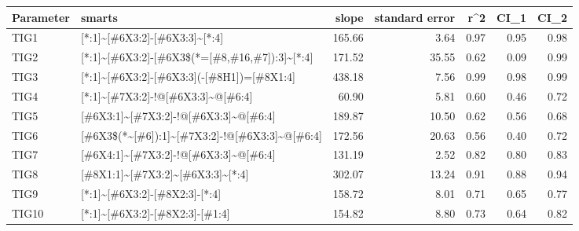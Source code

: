 \begin{tabular}{llrrrrr}
\toprule
Parameter &                                        smarts &  slope &  standard error &  r\textasciicircum 2 &  CI\_1 &  CI\_2 \\
\midrule
     TIG1 &                 [*:1]\textasciitilde [\#6X3:2]-[\#6X3:3]\textasciitilde [*:4] & 165.66 &            3.64 & 0.97 &  0.95 &  0.98 \\
     TIG2 & [*:1]\textasciitilde [\#6X3:2]-[\#6X3\$(*=[\#8,\#16,\#7]):3]\textasciitilde [*:4] & 171.52 &           35.55 & 0.62 &  0.09 &  0.99 \\
     TIG3 &     [*:1]\textasciitilde [\#6X3:2]-[\#6X3:3](-[\#8H1])=[\#8X1:4] & 438.18 &            7.56 & 0.99 &  0.98 &  0.99 \\
     TIG4 &             [*:1]\textasciitilde [\#7X3:2]-!@[\#6X3:3]\textasciitilde @[\#6:4] &  60.90 &            5.81 & 0.60 &  0.46 &  0.72 \\
     TIG5 &          [\#6X3:1]\textasciitilde [\#7X3:2]-!@[\#6X3:3]\textasciitilde @[\#6:4] & 189.87 &           10.50 & 0.62 &  0.56 &  0.68 \\
     TIG6 & [\#6X3\$(*\textasciitilde [\#6]):1]\textasciitilde [\#7X3:2]-!@[\#6X3:3]\textasciitilde @[\#6:4] & 172.56 &           20.63 & 0.56 &  0.40 &  0.72 \\
     TIG7 &          [\#6X4:1]\textasciitilde [\#7X3:2]-!@[\#6X3:3]\textasciitilde @[\#6:4] & 131.19 &            2.52 & 0.82 &  0.80 &  0.83 \\
     TIG8 &              [\#8X1:1]\textasciitilde [\#7X3:2]\textasciitilde [\#6X3:3]\textasciitilde [*:4] & 302.07 &           13.24 & 0.91 &  0.88 &  0.94 \\
     TIG9 &                 [*:1]\textasciitilde [\#6X3:2]-[\#8X2:3]-[*:4] & 158.72 &            8.01 & 0.71 &  0.65 &  0.77 \\
    TIG10 &                [*:1]\textasciitilde [\#6X3:2]-[\#8X2:3]-[\#1:4] & 154.82 &            8.80 & 0.73 &  0.64 &  0.82 \\
\bottomrule
\end{tabular}
